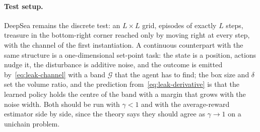 \documentclass[11pt]{article}
\theoremstyle{remark}
\newcommand{\Gcal}{\mathcal G}
\newcommand{\1}{\mathds{1}}
\newcommand{\new}[1]{\textcolor{blue!70!black}{#1}}
\begin{document}
\paragraph{Test setup.}
DeepSea remains the discrete test: an $L\times L$ grid, episodes of exactly $L$ steps, treasure in the bottom-right corner reached only by moving right at every step, with the channel of the first instantiation.
\new{A continuous counterpart with the same structure is a one-dimensional set-point task: the state is a position, actions nudge it, the disturbance is additive noise, and the outcome is emitted by~\eqref{eq:leak-channel} with a band $\Gcal$ that the agent has to find; the box size and $\delta$ set the volume ratio, and the prediction from~\eqref{eq:leak-derivative} is that the learned policy holds the centre of the band with a margin that grows with the noise width.
Both should be run with $\gamma<1$ and with the average-reward estimator side by side, since the theory says they should agree as $\gamma\to1$ on a unichain problem.}


  {\newcommand{\bibs}{action-sufficient,notes_joery/joery}}
  {\newcommand{\bibs}{../action-sufficient,joery}}

\end{document}
